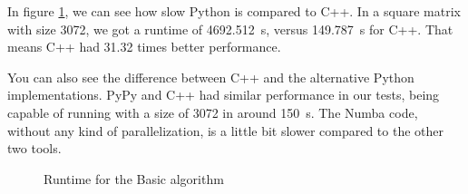 \documentclass[sigconf,balance,nonacm]{acmart}
\begin{document}
In figure \ref{fig:basic}, we can see how slow Python is compared to C++.
In a square matrix with size 3072, we got a runtime of \qty{4692.512}{\second}, versus \qty{149.787}{\second} for C++.
That means C++ had 31.32 times better performance.

You can also see the difference between C++ and the alternative Python implementations.
PyPy and C++ had similar performance in our tests, being capable of running with a size of 3072 in around \qty{150}{\second}.
The Numba code, without any kind of parallelization, is a little bit slower compared to the other two tools.

\begin{figure}[H]
    \centering
    \caption{Runtime for the Basic algorithm}
    \label{fig:basic}
\end{figure}
\end{document}
